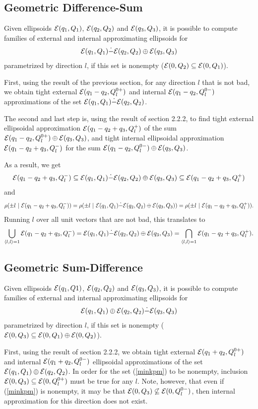 \documentclass{report}
\newcommand{\EE}{{\cal E}}
\begin{document}
\subsection{Geometric Difference-Sum}
Given ellipsoids $\EE(q_1,Q_1)$, $\EE(q_2,Q_2)$ and $\EE(q_3,Q_3)$, it is
possible to compute families of external and internal approximating
ellipsoids for 
\begin{equation}
\EE(q_1,Q_1) \dot{-} \EE(q_2,Q_2) \oplus \EE(q_3,Q_3) \label{minkmp}
\end{equation}
parametrized by direction $l$, if this set is nonempty
($\EE(0,Q_2)\subseteq\EE(0,Q_1)$).

First, using the result of the previous section, for any direction $l$ that
is not bad, we obtain tight external $\EE(q_1-q_2, Q_l^{0+})$ and internal
$\EE(q_1-q_2, Q_l^{0-})$ approximations of the set
$\EE(q_1,Q_1)\dot{-}\EE(q_2,Q_2)$.

The second and last step is, using the result of section 2.2.2, to find
tight external ellipsoidal approximation $\EE(q_1-q_2+q_3,Q_l^+)$ of the sum
$\EE(q_1-q_2,Q_l^{0+})\oplus\EE(q_3,Q_3)$, and tight internal ellipsoidal
approximation $\EE(q_1-q_2+q_3,Q_l^-)$ for the sum
$\EE(q_1-q_2,Q_l^{0-})\oplus\EE(q_3,Q_3)$.

As a result, we get
\[ \EE(q_1-q_2+q_3,Q_l^-) \subseteq
\EE(q_1,Q_1)\dot{-}\EE(q_2,Q_2)\oplus\EE(q_3,Q_3) \subseteq
\EE(q_1-q_2+q_3,Q_l^+) \]
and
\[ \rho(\pm l ~|~\EE(q_1-q_2+q_3,Q_l^-)) =
\rho(\pm l ~|~ \EE(q_1,Q_1)\dot{-}\EE(q_2,Q_2)\oplus\EE(q_3,Q_3)) =
\rho(\pm l ~|~ \EE(q_1-q_2+q_3,Q_l^+)). \]
Running $l$ over all unit vectors that are not bad, this translates to
\[ \bigcup_{\langle l,l\rangle=1} \EE(q_1-q_2+q_3,Q_l^-) =
\EE(q_1,Q_1)\dot{-}\EE(q_2,Q_2)\oplus\EE(q_3,Q_3) =
\bigcap_{\langle l,l\rangle=1} \EE(q_1-q_2+q_3,Q_l^+) .\]


\subsection{Geometric Sum-Difference}
Given ellipsoids $\EE(q_1,Q1)$, $\EE(q_2,Q_2)$ and $\EE(q_3,Q_3)$, it is
possible to compute families of external and internal approximating
ellipsoids for 
\begin{equation}
\EE(q_1,Q_1) \oplus \EE(q_2,Q_2) \dot{-} \EE(q_3,Q_3) \label{minkpm}
\end{equation}
parametrized by direction $l$, if this set is nonempty
($\EE(0,Q_3)\subseteq\EE(0,Q_1)\oplus\EE(0,Q_2)$).

First, using the result of section 2.2.2, we obtain tight external
$\EE(q_1+q_2,Q_l^{0+})$ and internal $\EE(q_1+q_2,Q_l^{0-})$ ellipsoidal
approximations of the set $\EE(q_1,Q_1)\oplus\EE(q_2,Q_2)$.
In order for the set (\ref{minkpm}) to be nonempty, inclusion
$\EE(0,Q_3)\subseteq\EE(0,Q_l^{0+})$ must be true for any $l$.
Note, however, that even if (\ref{minkpm}) is nonempty, it may be that
$\EE(0,Q_3)\not\subseteq\EE(0,Q_l^{0-})$, then internal approximation for this
direction does not exist.
\end{document}
